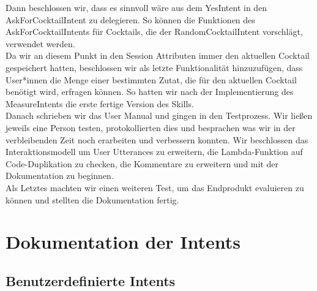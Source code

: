 \documentclass[12pt,letterpaper]{article}
\begin{document}
Dann beschlossen wir, dass es sinnvoll wäre aus dem YesIntent in den AskForCocktailIntent zu delegieren. So können die Funktionen des AskForCocktailIntents für Cocktails, die der RandomCocktailIntent vorschlägt, verwendet werden. \\ 
Da wir an diesem Punkt in den Session Attributen immer den aktuellen Cocktail gespeichert hatten, beschlossen wir als letzte Funktionalität hinzuzufügen, dass User*innen die Menge einer bestimmten Zutat, die für den aktuellen Cocktail benötigt wird, erfragen können. So hatten wir nach der Implementierung des MeasureIntents die erste fertige Version des Skills. \\
Danach schrieben wir das User Manual und gingen in den Testprozess. Wir ließen jeweils eine Person testen, protokollierten dies und besprachen was wir in der verbleibenden Zeit noch erarbeiten und verbessern konnten. Wir beschlossen das Interaktionsmodell um User Utterances zu erweitern, die Lambda-Funktion auf Code-Duplikation zu checken, die Kommentare zu erweitern und mit der Dokumentation zu beginnen. \\
Als Letztes machten wir einen weiteren Test, um das Endprodukt evaluieren zu können und stellten die Dokumentation fertig.

\section{Dokumentation der Intents}
\subsection{Benutzerdefinierte Intents}
\end{document}
